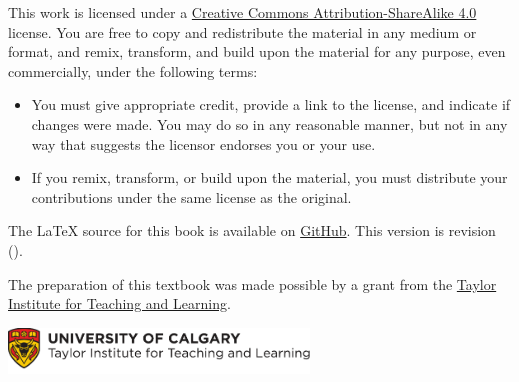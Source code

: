 \bigskip

\noindent \footnotesize This work is licensed under a \href{https://creativecommons.org/licenses/by-sa/4.0/}{Creative Commons Attribution-ShareAlike 4.0} license. 
You are free to copy and redistribute the material in any medium or format, and  remix, transform, and build upon the material for any purpose, even commercially, under the following terms:
\begin{itemize}
\item You must give appropriate credit, provide a link to the license, and indicate if changes were made. You may do so in any reasonable manner, but not in any way that suggests the licensor endorses you or your use.
\item If you remix, transform, or build upon the material, you must distribute your contributions under the same license as the original.
\end{itemize}

\vfil\normalsize\noindent
The \LaTeX{} source for this book is available
on \href{https://github.com/rzach/forallx-yyc/}{GitHub}. This version
is revision \gitAbbrevHash{} (\gitAuthorDate).

\bigskip
\noindent The preparation of this textbook was made possible by a grant from the \href{http://www.ucalgary.ca/taylorinstitute/}{Taylor Institute for Teaching and Learning}.

\bigskip
\noindent
\href{http://www.ucalgary.ca/taylorinstitute/}{\includegraphics[width=8cm]{assets/ti-color}}
\normalsize 
